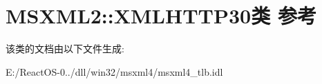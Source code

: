 \hypertarget{class_m_s_x_m_l2_1_1_x_m_l_h_t_t_p30}{}\section{M\+S\+X\+M\+L2\+:\+:X\+M\+L\+H\+T\+T\+P30类 参考}
\label{class_m_s_x_m_l2_1_1_x_m_l_h_t_t_p30}


该类的文档由以下文件生成\+:\begin{DoxyCompactItemize}
\item 
E\+:/\+React\+O\+S-\/0../dll/win32/msxml4/msxml4\+\_\+tlb.\+idl\end{DoxyCompactItemize}
